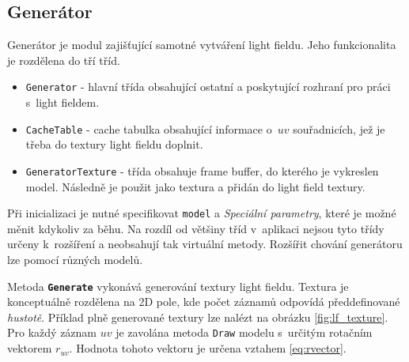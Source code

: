 
\subsection{Generátor}
Generátor je modul zajišťující samotné vytváření light fieldu. Jeho funkcionalita je rozdělena do tří tříd.
\begin{itemize}
    \item \texttt{Generator} - hlavní třída obsahující ostatní a poskytující rozhraní pro práci s~light fieldem. 
    \item \texttt{CacheTable} - cache tabulka obsahující informace o~${uv}$ souřadnicích, jež je třeba do textury light fieldu doplnit.
    \item \texttt{GeneratorTexture} - třída obsahuje frame buffer, do kterého je vykreslen model. Následně je použit jako textura a přidán do light field textury.
\end{itemize}
Při inicializaci je nutné specifikovat \texttt{model} a \emph{Speciální parametry}, které je možné měnit kdykoliv za běhu. Na rozdíl od většiny tříd v~aplikaci nejsou tyto třídy určeny k~rozšíření a neobsahují tak virtuální metody. Rozšířit chování generátoru lze pomocí různých modelů.

Metoda \texttt{\textbf{Generate}} vykonává generování textury light fieldu. Textura je konceptuálně rozdělena na 2D pole, kde počet záznamů odpovídá předdefinované \emph{hustotě}. Příklad plně generované textury lze nalézt na obrázku \ref{fig:lf_texture}. Pro každý záznam $uv$ je zavolána metoda \texttt{Draw} modelu s~určitým rotačním vektorem $r_{uv}$. Hodnota tohoto vektoru je určena vztahem \ref{eq:rvector}.


